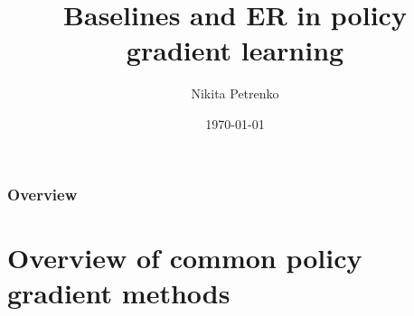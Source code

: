 \documentclass{beamer}
\title[Q-prop]{Baselines and ER in policy gradient learning} %
\author{Nikita Petrenko} %
\date{\today} %
\begin{document}
\begin{frame}
\titlepage %
\end{frame}

\begin{frame}
\frametitle{Overview} %
\tableofcontents %
\end{frame}


\section{Overview of common policy gradient methods} %
\end{document}
